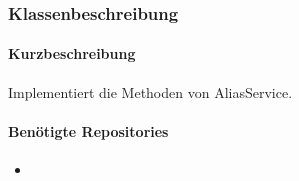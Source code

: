 \subsubsection*{Klassenbeschreibung}%
\paragraph*{Kurzbeschreibung}
Implementiert die Methoden von AliasService.
\paragraph*{Benötigte Repositories}
\begin{itemize}
    \item 
\end{itemize}
